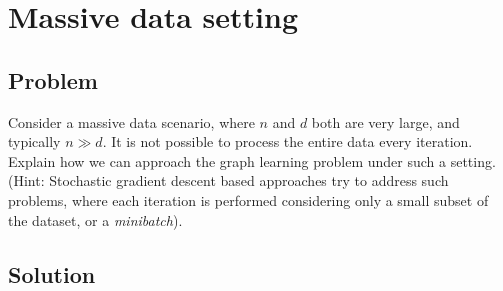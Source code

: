 \documentclass[a4paper]{article}
\begin{document}

\newpage

\section{Massive data setting}

\subsection{Problem}

Consider a massive data scenario, where $n$ and $d$ both are very large, and typically $n \gg d$. It is not possible to process the entire data every iteration. Explain how we can approach
the graph learning problem under such a setting. (Hint: Stochastic gradient descent based approaches try to address such problems, where each iteration is performed considering only a small
subset of the dataset, or a \emph{minibatch}).

\subsection{Solution}
\end{document}
